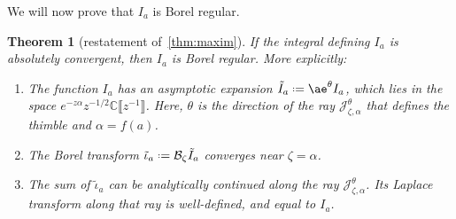 \documentclass{article}
\newcommand{\C}{\mathbb{C}}
\newcommand{\series}[1]{\tilde{#1}}
\newcommand*{\defeq}{\mathrel{\vcenter{\baselineskip0.5ex \lineskiplimit0pt
                     \hbox{\scriptsize.}\hbox{\scriptsize.}}}%
                     =}
\newcommand{\borel}{\mathcal{B}}
\newcommand{\aexp}{\mathrm{\ae}}
\theoremstyle{definition}
\theoremstyle{plain}
\newtheorem{theorem}{Theorem}[section]
\begin{document}
We will now prove that $I_a$ is Borel regular.
\begin{theorem}[restatement of~\ref{thm:maxim}]\label{thm:maxim-proof}
If the integral defining $I_a$ is absolutely convergent, then $I_a$ is Borel regular. More explicitly:
\begin{enumerate}
\item\label{part-1-prf} The function $I_a$ has an asymptotic expansion $\series{I}_a \defeq \aexp^\theta I_a$, which lies in the space $e^{-z \alpha} z^{-1/2} \C\llbracket z^{-1}\rrbracket$. Here, $\theta$ is the direction of the ray $\mathcal{J}^\theta_{\zeta, \alpha}$ that defines the thimble and $\alpha=f(a)$.
\item\label{part-2-prf} The Borel transform $\series{\iota}_a \defeq \borel_\zeta \series{I}_a$ converges near $\zeta = \alpha$.
\item\label{part-3-prf} The sum of $\series{\iota}_a$ can be analytically continued along the ray $\mathcal{J}_{\zeta, \alpha}^\theta$. Its Laplace transform along that ray is well-defined, and equal to $I_a$.
\end{enumerate}
\end{theorem}
\end{document}
